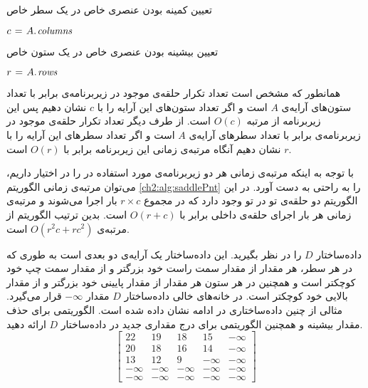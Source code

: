 \begin{algorithm}
\caption{تعیین کمینه بودن عنصری خاص در یک سطر خاص}\label{ch2:alg:minInRow}
\begin{latin}
\begin{algorithmic}[1]
		\State	$c\mathrel{\hspace{1pt}=\hspace{1pt}} A.\hspace*{1pt}\mathit{columns}$
						\State	\Return {}
				\EndIf
		\EndFor
		\State	\Return {}
\EndFunction
\end{algorithmic}
\end{latin}
\end{algorithm}

\begin{algorithm}
\caption{تعیین بیشینه بودن عنصری خاص در یک ستون خاص}\label{ch2:alg:maxInCol}
\begin{latin}
\begin{algorithmic}[1]
		\State	$r\mathrel{\hspace{1pt}=\hspace{1pt}} A.\hspace*{1pt}\mathit{rows}$
						\State	\Return {}
				\EndIf
		\EndFor
		\State	\Return {}
\EndFunction
\end{algorithmic}
\end{latin}
\end{algorithm}

همانطور که مشخص است تعداد تکرار حلقه‌ی موجود در زیربرنامه‌ی {} برابر با تعداد ستون‌های آرایه‌ی {$A$} است و اگر تعداد ستون‌های این آرایه را با {$c$} نشان دهیم پس این زیربرنامه‌ از مرتبه {$O(c)$} است. از طرف دیگر تعداد تکرار حلقه‌ی موجود در زیربرنامه‌ی {} برابر با تعداد سطرهای آرایه‌ی {$A$} است و اگر تعداد سطرهای این آرایه را با {$r$} نشان دهیم آنگاه مرتبه‌ی زمانی این زیربرنامه برابر با {$O(r)$} است.

با توجه به اینکه مرتبه‌ی زمانی هر دو زیربرنامه‌ی مورد استفاده در {} را در اختیار داریم، می‌توان مرتبه‌ی زمانی الگوریتم {\eqref{ch2:alg:saddlePnt}} را به راحتی به دست آورد. در این الگوریتم دو حلقه‌ی تو در تو وجود دارد که در مجموع {$r\times c$} بار اجرا می‌شوند و مرتبه‌ی زمانی هر بار اجرای حلقه‌ی داخلی برابر با {$O(r+c)$} است. بدین ترتیب الگوریتم {} از مرتبه‌ی {$O(r^2c+rc^2)$} است.

 داده‌‌ساختار {$D$} را در نظر بگیرید. این داده‌ساختار یک آرایه‌ی دو بعدی است به طوری که در هر سطر، هر مقدار از مقدار سمت راست خود بزرگتر و از مقدار سمت چپ خود کوچکتر است و همچنین در هر ستون هر مقدار از مقدار پایینی خود بزرگتر و از مقدار بالایی خود کوچکتر است. در خانه‌های خالی داده‌ساختار {$D$} مقدار {$-\infty$} قرار می‌گیرد. مثالی از چنین داده‌ساختاری در ادامه نشان داده شده است.  الگوریتمی برای حذف مقدار بیشینه و همچنین الگوریتمی برای درج مقداری جدید در داده‌ساختار {$D$} ارائه دهید.
$$
\begin{bmatrix}
22 & 19 & 18 & 15 & -\infty\\
20 & 18 & 16 & 14 & -\infty\\
13 & 12 & 9 & -\infty & -\infty\\
-\infty & -\infty & -\infty & -\infty & -\infty\\
-\infty & -\infty & -\infty & -\infty & -\infty
\end{bmatrix}
$$

